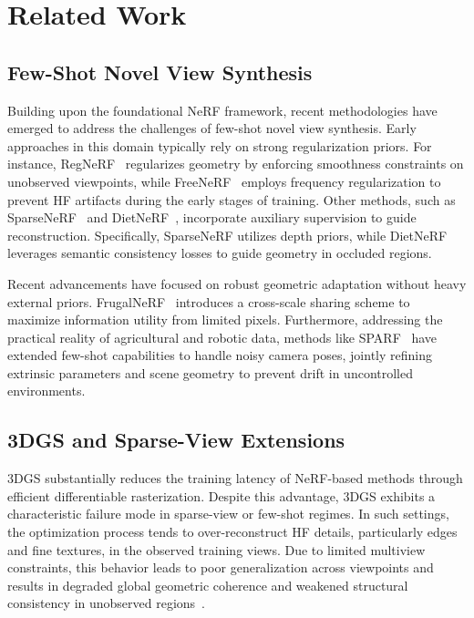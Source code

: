 \section{Related Work}

\subsection{Few-Shot Novel View Synthesis}
Building upon the foundational NeRF framework, recent methodologies have emerged to address the challenges of few-shot novel view synthesis. Early approaches in this domain typically rely on strong regularization priors. For instance, RegNeRF~\cite{niemeyer2022regnerf} regularizes geometry by enforcing smoothness constraints on unobserved viewpoints, while FreeNeRF~\cite{yang2023freenerf} employs frequency regularization to prevent HF artifacts during the early stages of training. Other methods, such as SparseNeRF~\cite{roessle2022sparsenerf} and DietNeRF~\cite{jain2021putting}, incorporate auxiliary supervision to guide reconstruction. Specifically, SparseNeRF utilizes depth priors, while DietNeRF leverages semantic consistency losses to guide geometry in occluded regions.

Recent advancements have focused on robust geometric adaptation without heavy external priors. FrugalNeRF~\cite{lin2025frugalnerf} introduces a cross-scale sharing scheme to maximize information utility from limited pixels. Furthermore, addressing the practical reality of agricultural and robotic data, methods like SPARF~\cite{truong2023sparf} have extended few-shot capabilities to handle noisy camera poses, jointly refining extrinsic parameters and scene geometry to prevent drift in uncontrolled environments.

\subsection{3DGS and Sparse-View Extensions}

3DGS substantially reduces the training latency of NeRF-based methods through efficient differentiable rasterization. Despite this advantage, 3DGS exhibits a characteristic failure mode in sparse-view or few-shot regimes. In such settings, the optimization process tends to over-reconstruct HF details, particularly edges and fine textures, in the observed training views. Due to limited multiview constraints, this behavior leads to poor generalization across viewpoints and results in degraded global geometric coherence and weakened structural consistency in unobserved regions~\cite{nguyen2025dwtnerf}.

